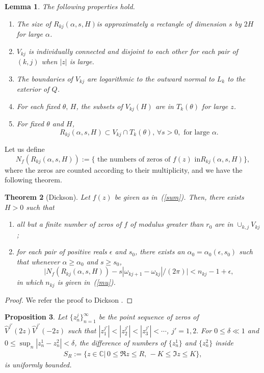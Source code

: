 \documentclass[10pt,a4paper]{article}
\theoremstyle{plain}
\newtheorem{theorem}{Theorem}[section]
\newtheorem{lemma}[theorem]{Lemma}
\newtheorem{proposition}[theorem]{Proposition}
\theoremstyle{definition}
\theoremstyle{remark}
\numberwithin{equation}{section}
\begin{document}
\begin{lemma}\label{214}
The following properties hold.
\begin{enumerate}
\item The size of $R_{kj}(\alpha,s,H)$is approximately a rectangle
of dimension $s$ by $2H$ for large $\alpha$. \item $V_{kj}$ is
individually connected and disjoint to each other for each pair of
$(k,j)$ when $|z|$ is large. \item The boundaries of $V_{kj}$ are
logarithmic to the outward normal to $L_k$ to the exterior of $Q$.
\item For each fixed $\theta,\,H$, the subsets of $V_{kj}(H)$ are
in $T_k(\theta)$ for large $z$. \item For fixed $\theta$ and $H$,
\begin{equation}
 R_{kj}(\alpha,s,H)\subset V_{kj}\cap T_k(\theta),\,\forall
 s>0,\mbox{ for large }\alpha.
\end{equation}
\end{enumerate}
\end{lemma}
Let us define
\begin{equation}\nonumber
N_f(R_{kj}(\alpha,s,H)):=\{\mbox{ the numbers of zeros of }f(z)\mbox{ in
}R_{kj}(\alpha,s,H)\},
\end{equation}
where the zeros are counted according to their multiplicity, and we have the
following theorem.
\begin{theorem}[Dickson]\label{Dickson}
Let $f(z)$ be given as in~(\ref{sum}). Then, there exists $H>0$
such that \begin{enumerate}
               \item all but a finite number of zeros of $f$ of modulus
greater than $r_0$ are in $\cup_{k,j}V_{kj}$;
               \item
for each pair
of positive reals $\epsilon$ and $s_0$, there exists an
$\alpha_0=\alpha_0(\epsilon,s_0)$ such that whenever
$\alpha\geq\alpha_0$ and $s\geq s_0$,
\begin{equation}\label{2.9}
\big|N_f(R_{kj}(\alpha,s,H))-s|\omega_{kj+1}-\omega_{kj}|/(2\pi)\big|<n_{kj}-1+\epsilon,
\end{equation}
in which $n_{kj}$ is given in~(\ref{mu}).
\end{enumerate}
\end{theorem}
\begin{proof}
We refer the proof to Dickson \cite{Dickson}.
\end{proof}
\begin{proposition}\label{D}
Let $\{z_{n}^{j}\}_{n=1}^{\infty}$ be the point sequence of zeros of $\hat{V}^{j'}(2z)\hat{V}^{j'}(-2z)$ such that $|z_{1}^{j'}|<|z_{2}^{j'}|<|z_{3}^{j'}|<\cdots$, $j'=1,2.$ For $0\leq\delta\ll 1$ and $0\leq\sup_{n}|z^{1}_{n}-z^{2}_{n}|<\delta$, the difference of numbers of $\{z^{1}_{n}\}$ and $\{z^{2}_{n}\}$ inside  \begin{eqnarray*}
S_{R}:=\{z\in\mathbb{C}|\,0\leq\Re z\leq R,\,-K\leq\Im z\leq  K\},
\end{eqnarray*} is uniformly bounded.
\end{proposition}
\end{document}
